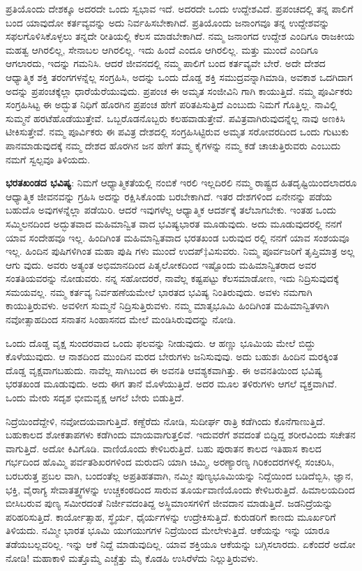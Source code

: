 ಪ್ರತಿಯೊಂದು ದೇಶಕ್ಕೂ ಅದರದೇ ಒಂದು ಸ್ವಭಾವ ಇದೆ. ಅದರದೇ ಒಂದು ಉದ್ದೇಶವಿದೆ. ಪ್ರಪಂಚದಲ್ಲಿ ತನ್ನ ಪಾಲಿಗೆ ಬಂದ ಯಾವುದೋ ಕರ್ತವ್ಯವನ್ನು ಅದು ನಿರ್ವಹಿಸಬೇಕಾಗಿದೆ. ಪ್ರತಿಯೊಂದು ಜನಾಂಗವೂ ತನ್ನ ಉದ್ದೇಶವನ್ನು ಸಫಲಗೊಳಿಸಿಕೊಳ್ಳಲು ತನ್ನದೇ ರೀತಿಯಲ್ಲಿ ಕೆಲಸ ಮಾಡಬೇಕಾಗಿದೆ. ನಮ್ಮ ಜನಾಂಗದ ಉದ್ದೇಶ ಎಂದಿಗೂ ರಾಜಕೀಯ ಮಹತ್ವ ಆಗಿರಲಿಲ್ಲ, ಸೇನಾಬಲ ಆಗಿರಲಿಲ್ಲ. ಇದು ಹಿಂದೆ ಎಂದೂ ಆಗಿರಲಿಲ್ಲ. ಮತ್ತು ಮುಂದೆ ಎಂದಿಗೂ ಆಗಲಾರದು, ಇದನ್ನು ಗಮನಿಸಿ. ಆದರೆ ಜೀವನದಲ್ಲಿ ನಮ್ಮ ಪಾಲಿಗೆ ಬಂದ ಕರ್ತವ್ಯವೇ ಬೇರೆ. ಅದೇ ದೇಶದ ಆಧ್ಯಾತ್ಮಿಕ ಶಕ್ತಿ ತರಂಗಗಳನ್ನೆಲ್ಲ ಸಂಗ್ರಹಿಸಿ, ಅದನ್ನು ಒಂದು ದೊಡ್ಡ ಶಕ್ತಿ ಸಮುದ್ರವನ್ನಾಗಿಮಾಡಿ, ಅವಕಾಶ ಒದಗಿದಾಗ ಅದನ್ನು ಪ್ರಪಂಚಕ್ಕೆಲ್ಲಾ ಧಾರೆಯೆರೆಯುವುದು. ಪ್ರಪಂಚ ಈ ಅಮೃತ ಸಂಜೀವಿನಿ ಗಾಗಿ ಕಾಯುತ್ತಿದೆ. ನಮ್ಮ ಪೂರ್ವಿಕರು ಸಂಗ್ರಹಿಸಿಟ್ಟ ಈ ಅದ್ಭುತ ನಿಧಿಗೆ ಹೊರಗಿನ ಪ್ರಪಂಚ ಹೇಗೆ ಪರಿತಪಿಸುತ್ತಿದೆ ಎಂಬುದು ನಿಮಗೆ ಗೊತ್ತಿಲ್ಲ. ನಾವಿಲ್ಲಿ ಸುಮ್ಮನೆ ಹರಟೆಹೊಡೆಯುತ್ತೇವೆ. ಒಬ್ಬರೊಡನೊಬ್ಬರು ಕಲಹವಾಡುತ್ತೇವೆ. ಪವಿತ್ರವಾಗಿರುವುದನ್ನೆಲ್ಲ ನಾವು ಅಣಕಿಸಿ ಟೀಕಿಸುತ್ತೇವೆ. ನಮ್ಮ ಪೂರ್ವಿಕರು ಈ ಪವಿತ್ರ ದೇಶದಲ್ಲಿ ಸಂಗ್ರಹಿಸಿಟ್ಟಿರುವ ಅಮೃತ ಸರೋವರದಿಂದ ಒಂದು ಗುಟುಕು ಪಾನಮಾಡುವುದಕ್ಕೆ ನಮ್ಮ ದೇಶದ ಹೊರಗಿನ ಜನ ಹೇಗೆ ತಮ್ಮ ಕೈಗಳನ್ನು ನಮ್ಮ ಕಡೆ ಚಾಚುತ್ತಿರುವರು ಎಂಬುದು ನಮಗೆ ಸ್ವಲ್ಪವೂ ತಿಳಿಯದು.

\textbf{ಭರತಖಂಡದ ಭವಿಷ್ಯ}: ನಿಮಗೆ ಆಧ್ಯಾತ್ಮಿಕತೆಯಲ್ಲಿ ನಂಬಿಕೆ ಇರಲಿ ಇಲ್ಲದಿರಲಿ ನಮ್ಮ ರಾಷ್ಟ್ರದ ಹಿತದೃಷ್ಟಿಯಿಂದಲಾದರೂ ಆಧ್ಯಾತ್ಮಿಕ ಜೀವನವನ್ನು ಗ್ರಹಿಸಿ ಅದನ್ನು ರಕ್ಷಿಸಿಕೊಂಡು ಬರಬೇಕಾಗಿದೆ. ಇತರ ದೇಶಗಳಿಂದ ಏನೇನನ್ನು ಪಡೆಯ ಬಹುದೊ ಅವುಗಳನ್ನೆಲ್ಲಾ ಪಡೆಯಿರಿ. ಆದರೆ ಇವುಗಳೆಲ್ಲ ಆಧ್ಯಾತ್ಮಿಕ ಆದರ್ಶಕ್ಕೆ ತಲೆಬಾಗಬೇಕು. ಇಂತಹ ಒಂದು ಸಮ್ಮಿಲನದಿಂದ ಅದ್ಭುತವಾದ ಮಹಿಮಾನ್ವಿತ ವಾದ ಭವಿಷ್ಯಭಾರತ ಮೂಡುವುದು. ಅದು ಮೂಡುವುದರಲ್ಲಿ ನನಗೆ ಯಾವ ಸಂದೇಹವೂ ಇಲ್ಲ. ಹಿಂದಿಗಿಂತ ಮಹಿಮಾನ್ವಿತವಾದ ಭರತಖಂಡ ಬರುವುದ ರಲ್ಲಿ ನನಗೆ ಯಾವ ಸಂಶಯವೂ ಇಲ್ಲ. ಹಿಂದಿನ ಪುಷಿಗಳಿಗಿಂತ ಮಹಾ ಪುಷಿ ಗಳು ಮುಂದೆ ಉದಪ್‡ವಿಸುವರು. ನಿಮ್ಮ ಪೂರ್ವಜರಿಗೆ ತೃಪ್ತಿಮಾತ್ರ ಅಲ್ಲ ಆಗು ವುದು. ಅವರು ಅತ್ಯಂತ ಅಭಿಮಾನದಿಂದ ಪಿತೃಲೋಕದಿಂದ ಇಷ್ಟೊಂದು ಮಹಿಮಾನ್ವಿತರಾದ ಅವರ ಸಂತತಿಯವರನ್ನು ನೋಡುವರು. ನನ್ನ ಸಹೋದರರೆ, ನಾವೆಲ್ಲ ಕಷ್ಟಪಟ್ಟು ಕೆಲಸಮಾಡೋಣ, ಇದು ನಿದ್ರಿಸುವುದಕ್ಕೆ ಸಮಯವಲ್ಲ. ನಮ್ಮ ಕರ್ತವ್ಯ ನಿರ್ವಹಣೆಯಮೇಲೆ ಭಾರತದ ಭವಿಷ್ಯ ನಿಂತಿರುವುದು. ಅವಳು ನಮಗಾಗಿ ಕಾಯುತ್ತಿರುವಳು. ಅವಳೀಗ ಸುಮ್ಮನೆ ನಿದ್ರಿಸುತ್ತಿರುವಳು. ನಮ್ಮ ಮಾತೃಭೂಮಿ ಹಿಂದಿಗಿಂತ ಮಹಿಮಾನ್ವಿತಳಾಗಿ ನವೋತ್ಸಾಹದಿಂದ ಸನಾತನ ಸಿಂಹಾಸನದ ಮೇಲೆ ಮಂಡಿಸಿರುವುದನ್ನು ನೋಡಿ.

ಒಂದು ದೊಡ್ಡ ವೃಕ್ಷ ಸುಂದರವಾದ ಒಂದು ಫಲವನ್ನು ನೀಡುವುದು. ಆ ಹಣ್ಣು ಭೂಮಿಯ ಮೇಲೆ ಬಿದ್ದು ಕೊಳೆಯುವುದು. ಆ ನಾಶದಿಂದ ಮುಂದಿನ ಮರದ ಬೇರುಗಳು ಜನಿಸುವುವು. ಅದು ಬಹುಶಃ ಹಿಂದಿನ ಮರಕ್ಕಿಂತ ದೊಡ್ಡ ವೃಕ್ಷವಾಗಬಹುದು. ನಾವೆಲ್ಲ ಸಾಗಿಬಂದ ಈ ಅವನತಿ ಆವಶ್ಯಕವಾಗಿತ್ತು. ಈ ಅವನತಿಯಿಂದ ಭವಿಷ್ಯ ಭರತಖಂಡ ಮೂಡುವುದು. ಅದು ಈಗ ತಾನೆ ಮೊಳೆಯುತ್ತಿದೆ. ಅದರ ಮೂಲ ತಳಿರುಗಳು ಆಗಲೆ ವ್ಯಕ್ತವಾಗಿವೆ. ಒಂದು ಮೇರು ಸದೃಶ ಭೀಮವೃಕ್ಷ ಆಗಲೆ ಬೇರು ಬಿಡುತ್ತಿದೆ.

ನಿದ್ರೆಯಿಂದೆದ್ದೇಳಿ, ನವೋದಯವಾಗುತ್ತಿದೆ. ಕಣ್ದೆರೆದು ನೋಡಿ, ಸುದೀರ್ಘ ರಾತ್ರಿ ಕಡೆಗಿಂದು ಕೊನೆಗಾಣುತ್ತಿದೆ. ಬಹುಕಾಲದ ಶೋಕತಾಪಗಳು ಕಡೆಗಿಂದು ಮಾಯವಾಗುತ್ತಲಿವೆ. ಇದುವರೆಗೆ ಶವದಂತೆ ಬಿದ್ದಿದ್ದ ಶರೀರವಿಂದು ಸಚೇತನ ವಾಗುತ್ತಿದೆ. ಅದೋ ಕಿವಿಗೊಡಿ. ವಾಣಿಯೊಂದು ಕೇಳಿಬರುತ್ತಿದೆ. ಬಹು ಪುರಾತನ ಕಾಲದ ಇತಿಹಾಸ ಕಾಲದ ಗರ್ಭದಿಂದ ಹೊಮ್ಮಿ ಪರ್ವತಶಿಖರಗಳಿಂದ ಮರುದನಿ ಯಾಗಿ ಚಿಮ್ಮಿ, ಅರಣ್ಯಾರಣ್ಯ ಗಿರಿಕಂದರಗಳಲ್ಲಿ ಸಂಚರಿಸಿ, ಬರಬರುತ್ತ ಪ್ರಬಲ ವಾಗಿ, ಬಂದಂತೆಲ್ಲ ಅಪ್ರತಿಹತವಾಗಿ, ನಮ್ಮೀ ಪುಣ್ಯಭೂಮಿಯನ್ನು ನಿದ್ದೆಯಿಂದ ಬಡಿದೆಬ್ಬಿಸಿ, ಜ್ಞಾನ, ಭಕ್ತಿ, ವೈರಾಗ್ಯ ಸೇವಾತತ್ತ್ವಗಳನ್ನು ಉಚ್ಚಕಂಠದಿಂದ ಸಾರುವ ತೂರ್ಯವಾಣಿಯೊಂದು ಕೇಳಿಬರುತ್ತಿದೆ. ಹಿಮಾಲಯದಿಂದ ಬೀಸಿಬರುವ ಪುಣ್ಯ ಸಮೀರದಂತೆ ನಿರ್ಜೀವದಂತಿದ್ದ ಅಸ್ಥಿಮಾಂಸಗಳಿಗೆ ಜೀವದಾನ ಮಾಡುತ್ತಿದೆ. ಜಡನಿದ್ರೆಯನ್ನು ಪರಿಹರಿಸುತ್ತಿದೆ. ಕಾರ್ಯೋತ್ಸಾಹ, ಸ್ಥೈರ್ಯ, ಧೈರ್ಯಗಳನ್ನು ಉದ್ರೇಕಿಸುತ್ತಿದೆ. ಕುರುಡರಿಗೆ ಕಾಣದು ಮೂರ್ಖರಿಗೆ ತಿಳಿಯದು. ನಮ್ಮೀ ಭಾರತ ಭೂಮಿ ಯುಗಯುಗಗಳ ನಿದ್ರೆಯಿಂದ ಮೇಲೇಳುತ್ತಿದೆ. ಆಕೆಯನ್ನು ಇನ್ನು ಯಾರೂ ತಡೆಯಬಲ್ಲವರಿಲ್ಲ. ಇನ್ನು ಆಕೆ ನಿದ್ದೆ ಮಾಡುವುದಿಲ್ಲ. ಯಾವ ಶಕ್ತಿಯೂ ಆಕೆಯನ್ನು ಬಗ್ಗಿಸಲಾರದು. ಏಕೆಂದರೆ ಅದೋ ನೋಡಿ! ಮಹಾಕಾಳಿ ಮತ್ತೊಮ್ಮೆ ಎಚ್ಚೆತ್ತು ಮೈ ಕೊಡಹಿ ಉಸಿರೆಳೆದು ನಿಲ್ಲುತ್ತಿರುವಳು.

